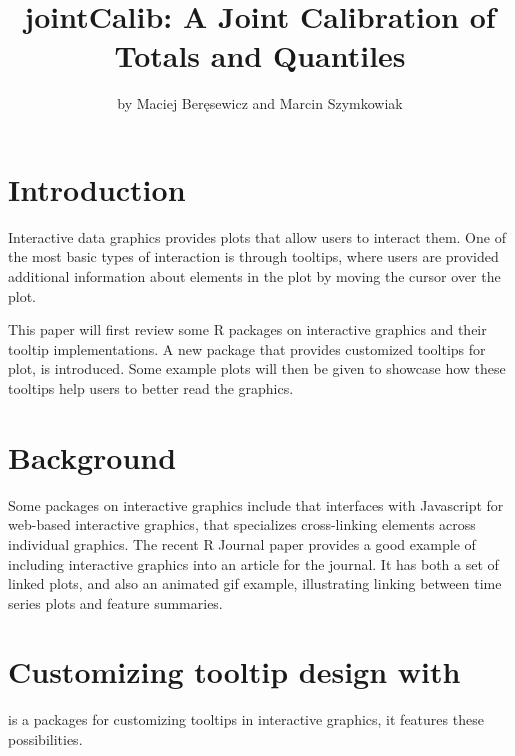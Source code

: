 \title{jointCalib: A Joint Calibration of Totals and Quantiles}


\author{by Maciej Beręsewicz and Marcin Szymkowiak}

\maketitle


\section{Introduction}\label{introduction}

Interactive data graphics provides plots that allow users to interact
them. One of the most basic types of interaction is through tooltips,
where users are provided additional information about elements in the
plot by moving the cursor over the plot.

This paper will first review some R packages on interactive graphics and
their tooltip implementations. A new package  that
provides customized tooltips for plot, is introduced. Some example plots
will then be given to showcase how these tooltips help users to better
read the graphics.

\section{Background}\label{background}

Some packages on interactive graphics include  \citep{plotly}
that interfaces with Javascript for web-based interactive graphics,
 \citep{crosstalk} that specializes cross-linking elements
across individual graphics. The recent R Journal paper
 \citep{RJ-2021-050} provides a good example of
including interactive graphics into an article for the journal. It has
both a set of linked plots, and also an animated gif example,
illustrating linking between time series plots and feature summaries.

\section{\texorpdfstring{Customizing tooltip design with }{Customizing tooltip design with }}\label{customizing-tooltip-design-with}

 is a packages for customizing tooltips in interactive
graphics, it features these possibilities.

